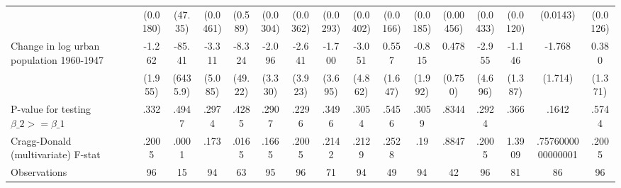 {\begin{tabular}{l*{15}{c}}
                & (0.0180)         &  (47.35)         & (0.0461)         &  (0.589)         & (0.0304)         & (0.0362)         & (0.0293)         & (0.0402)         & (0.0166)         & (0.0185)         &(0.00456)         & (0.0433)         & (0.0120)         & (0.0143)         & (0.0126)         \\
[1em]
Change in log urban population 1960-1947&   -1.262         &   -85.41         &   -3.311         &   -8.324         &   -2.096         &   -2.641         &   -1.700         &   -3.051         &    0.557         &   -0.815         &    0.478         &   -2.955         &   -1.146         &   -1.768         &    0.380         \\
                &  (1.955)         & (6435.9)         &  (5.085)         &  (49.22)         &  (3.330)         &  (3.923)         &  (3.695)         &  (4.862)         &  (1.647)         &  (1.992)         &  (0.750)         &  (4.696)         &  (1.387)         &  (1.714)         &  (1.371)         \\
\hline
P-value for testing $\beta\_{2} >= \beta\_{1}$&     .332         &    .4947         &    .2974         &    .4285         &    .2907         &    .2296         &    .3496         &    .3054         &    .5456         &    .3059         &    .8344         &    .2924         &     .366         &    .1642         &    .5744         \\
Cragg-Donald (multivariate) F-stat&    .2005         &    .0001         &     .173         &    .0165         &    .1665         &    .2005         &    .2142         &    .2129         &    .2528         &      .19         &    .8847         &    .2005         &   1.3909         &.7576000000000001         &    .2005         \\
Observations    &       96         &       15         &       94         &       63         &       95         &       96         &       71         &       94         &       49         &       94         &       42         &       96         &       81         &       86         &       96         \\
\hline\hline
\end{tabular}
}
